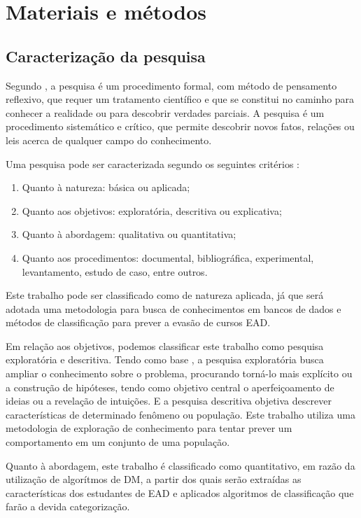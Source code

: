 \chapter{Materiais e métodos}

\section{Caracterização da pesquisa}

Segundo , a pesquisa é um procedimento
formal, com método de pensamento reflexivo, que requer um tratamento científico
e que se constitui no caminho para conhecer a realidade ou para descobrir
verdades parciais. A pesquisa é um procedimento sistemático e crítico,  que
permite descobrir novos fatos, relações ou leis acerca de qualquer campo do
conhecimento.

Uma pesquisa pode ser caracterizada segundo os seguintes critérios
\cite{gil2008metodos}:
\begin{enumerate}[label=\alph*)]
  \item Quanto à natureza: básica ou aplicada;
  \item Quanto aos objetivos: exploratória, descritiva ou explicativa;
  \item Quanto à abordagem: qualitativa ou quantitativa;
  \item Quanto aos procedimentos: documental, bibliográfica, experimental,
  levantamento, estudo de caso, entre outros.
\end{enumerate}

Este trabalho pode ser classificado como de natureza aplicada, já que será
adotada uma metodologia para busca de conhecimentos em bancos de dados e métodos
de classificação para prever a evasão de cursos EAD.

Em relação aos objetivos, podemos classificar este trabalho como pesquisa
exploratória e descritiva. Tendo como base , a
pesquisa exploratória busca ampliar o conhecimento sobre o problema, procurando
torná-lo mais explícito ou a construção de hipóteses, tendo como objetivo
central o aperfeiçoamento de ideias ou a revelação de intuições. E a pesquisa
descritiva objetiva descrever características de determinado fenômeno ou
população. Este trabalho utiliza uma metodologia de exploração de conhecimento
para tentar prever um comportamento em um conjunto de uma população.

Quanto à abordagem, este trabalho é classificado como quantitativo, em razão da
utilização de algorítmos de DM, a partir dos quais serão extraídas as
características dos estudantes de EAD e aplicados algoritmos de classificação
que farão a devida categorização.

